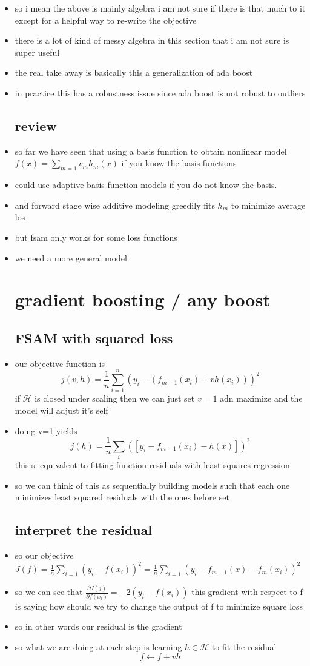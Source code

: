 \documentclass{article}
\begin{document}
\begin{itemize}
\item so i mean the above is mainly algebra i am not sure if there is that much to it except for a helpful way to re-write the objective
\item there is a lot of kind of messy algebra in this section that i am not sure is super useful
\item the real take away is basically this a generalization of ada boost
\item in practice this has a robustness issue since ada boost is not robust to outliers
\subsection*{review}
\item so far we have seen that using a basis function to obtain nonlinear model $f(x)=\sum_{m=1}v_mh_m(x)$ if you know the basis functions
\item could use adaptive basis function models if you do not know the basis. 
\item and forward stage wise additive modeling greedily fits $h_m$ to minimize average los 
\item but fsam only works for some loss functions 
\item we need a more general model 
\section*{gradient boosting / any boost}
\subsection*{FSAM with squared loss}
\item our objective function is $$j(v,h)=\frac{1}{n}\sum_{i=1}^{n}(y_i-(f_{m-1}(x_i)+vh(x_i)))^2 $$ if $\mathcal{H}$ is closed under scaling then we can just set $v=1$ adn maximize and the model will adjust it's self 
\item doing v=1 yields $$j(h)=\frac{1}{n}\sum_{i}([y_i-f_{m-1}(x_i)-h(x)])^{2}$$ this si equivalent to fitting function residuals with least squares regression
\item  so we can think of this as sequentially building models such that each one minimizes least squared residuals with the ones before set 
\subsection*{interpret the residual}
\item so our objective $J(f)=\frac{1}{n}\sum_{i=1}(y_i-f(x_i))^2=\frac{1}{n}\sum_{i=1}(y_i-f_{m-1}(x)-f_m(x_i))^2$
\item so we can see that $\frac{\partial J(j)}{\partial f(x_i)}=-2(y_i-f(x_i))$ this gradient with respect to f is saying how should we try to change the output of f to minimize square loss
\item so in other words our residual is the gradient 
\item so what we are doing at each step is learning $h\in \mathcal{H}$ to fit the residual $$f\leftarrow f+vh$$

\end{itemize}
\end{document}

